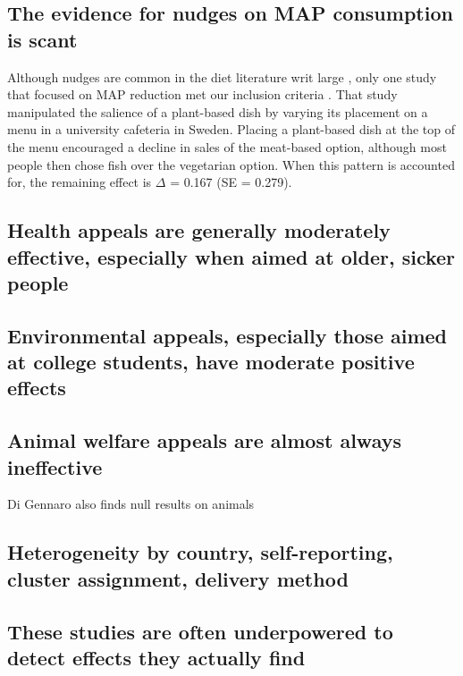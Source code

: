 \documentclass[sn-nature,pdflatex]{sn-jnl}
\begin{document}
\subsection{The evidence for nudges on MAP consumption is
scant}\label{the-evidence-for-nudges-on-map-consumption-is-scant}

Although nudges are common in the diet literature writ large
\citep{olafsson2024, cadario2020, szaszi2018}, only one study that
focused on MAP reduction met our inclusion criteria
\citep{andersson2021}. That study manipulated the salience of a
plant-based dish by varying its placement on a menu in a university
cafeteria in Sweden. Placing a plant-based dish at the top of the menu
encouraged a decline in sales of the meat-based option, although most
people then chose fish over the vegetarian option. When this pattern is
accounted for, the remaining effect is \(\Delta\) = 0.167 (SE = 0.279).

\subsection{Health appeals are generally moderately effective,
especially when aimed at older, sicker
people}\label{health-appeals-are-generally-moderately-effective-especially-when-aimed-at-older-sicker-people}

\subsection{Environmental appeals, especially those aimed at college
students, have moderate positive
effects}\label{environmental-appeals-especially-those-aimed-at-college-students-have-moderate-positive-effects}

\subsection{Animal welfare appeals are almost always
ineffective}\label{animal-welfare-appeals-are-almost-always-ineffective}

Di Gennaro also finds null results on animals

\subsection{Heterogeneity by country, self-reporting, cluster
assignment, delivery
method}\label{heterogeneity-by-country-self-reporting-cluster-assignment-delivery-method}

\subsection{These studies are often underpowered to detect effects they
actually
find}\label{these-studies-are-often-underpowered-to-detect-effects-they-actually-find}
\end{document}
